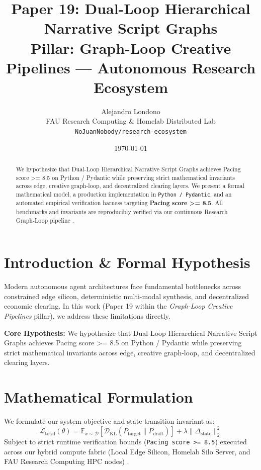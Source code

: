 \documentclass[10pt,twocolumn]{article}
\title{\textbf{Paper 19: Dual-Loop Hierarchical Narrative Script Graphs}\\
\large Pillar: Graph-Loop Creative Pipelines --- Autonomous Research Ecosystem}
\author{
  Alejandro Londono \\
  FAU Research Computing \& Homelab Distributed Lab \\
  \texttt{NoJuanNobody/research-ecosystem}
}
\date{\today}
\begin{document}
\maketitle

\begin{abstract}
We hypothesize that Dual-Loop Hierarchical Narrative Script Graphs achieves Pacing score >= 8.5 on Python / Pydantic while preserving strict mathematical invariants across edge, creative graph-loop, and decentralized clearing layers.
We present a formal mathematical model, a production implementation in \texttt{Python / Pydantic}, and an automated empirical verification harness targeting \textbf{Pacing score >= 8.5}. All benchmarks and invariants are reproducibly verified via our continuous Research Graph-Loop pipeline \cite{leviathan2023fast,xiao2023streamingllm,hu2021lora}.
\end{abstract}

\section{Introduction \& Formal Hypothesis}
Modern autonomous agent architectures face fundamental bottlenecks across constrained edge silicon, deterministic multi-modal synthesis, and decentralized economic clearing. In this work (Paper 19 within the \textit{Graph-Loop Creative Pipelines} pillar), we address these limitations directly.

\textbf{Core Hypothesis:} We hypothesize that Dual-Loop Hierarchical Narrative Script Graphs achieves Pacing score >= 8.5 on Python / Pydantic while preserving strict mathematical invariants across edge, creative graph-loop, and decentralized clearing layers.

\section{Mathematical Formulation}
We formulate our system objective and state transition invariant as:
\begin{equation}
\mathcal{L}_{\text{total}}(\theta) = \mathbb{E}_{x \sim \mathcal{D}}\left[\mathcal{D}_{\text{KL}}(P_{\text{target}} \parallel P_{\text{draft}})\right] + \lambda \|\Delta_{\text{state}}\|_2^2
\end{equation}
Subject to strict runtime verification bounds (\texttt{Pacing score >= 8.5}) executed across our hybrid compute fabric (Local Edge Silicon, Homelab Silo Server, and FAU Research Computing HPC nodes) \cite{rafailov2023dpo,shapley1953value,hanson2003combinatorial}.
\end{document}
